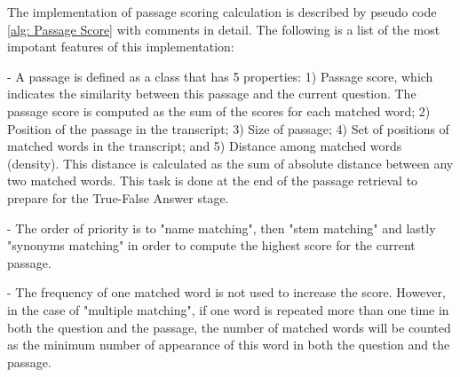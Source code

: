 The implementation of passage scoring calculation is described by pseudo code \ref{alg: Passage Score} with comments in detail. The following is a list of the most impotant features of this implementation:

- A passage is defined as a class that has 5 properties: 1) Passage score, which indicates the similarity between this passage and the current question. The passage score is computed as the sum of the scores for each matched word; 2) Position of the passage in the transcript; 3) Size of passage; 4) Set of positions of matched words in the transcript; and 5) Distance among matched words (density). This distance is calculated as the sum of absolute distance between any two matched words. This task is done at the end of the passage retrieval to prepare for the True-False Answer stage.


- The order of priority is to "name matching", then "stem matching" and lastly "synonyms matching" in order to compute the highest score for the current passage.

- The frequency of one matched word is not used to increase the score. However, in the case of "multiple matching", if one word is repeated more than one time in both the question and the passage, the number of matched words will be counted as the minimum number of appearance of this word in both the question and the passage. 



\newpage


